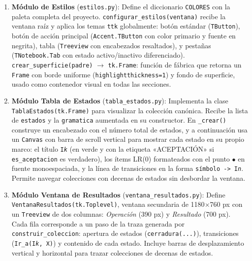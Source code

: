 \begin{enumerate}
  \item \textbf{Módulo de Estilos} (\texttt{estilos.py}):
    Define el diccionario \texttt{COLORES} con la paleta completa del proyecto.
    \texttt{configurar\_estilos(ventana)} recibe la ventana raíz y aplica los temas
    \texttt{ttk} globalmente: botón estándar (\texttt{TButton}), botón de acción
    principal (\texttt{Accent.TButton} con color primario y fuente en negrita),
    tabla (\texttt{Treeview} con encabezados resaltados), y pestañas
    (\texttt{TNotebook.Tab} con estado activo/inactivo diferenciado).
    \texttt{crear\_superficie(padre)} $\to$ \texttt{tk.Frame}: función de fábrica
    que retorna un \texttt{Frame} con borde uniforme (\texttt{highlightthickness=1})
    y fondo de superficie, usado como contenedor visual en todas las secciones.

  \item \textbf{Módulo Tabla de Estados} (\texttt{tabla\_estados.py}):
    Implementa la clase \texttt{TablaEstados(tk.Frame)} para visualizar la colección
    canónica. Recibe la lista de \texttt{estados} y la \texttt{gramatica} aumentada en
    su constructor. En \texttt{\_crear()} construye un encabezado con el número total
    de estados, y a continuación usa un \texttt{Canvas} con barra de scroll vertical
    para mostrar cada estado en su propio marco: el título \texttt{I\textit{k}} (en
    verde y con la etiqueta «ACEPTACIÓN» si \texttt{es\_aceptacion} es verdadero),
    los ítems LR(0) formateados con el punto $\bullet$ en fuente monoespaciada, y la
    línea de transiciones en la forma \texttt{símbolo -> I\textit{n}}. Permite navegar
    colecciones con decenas de estados sin desbordar la ventana.

  \item \textbf{Módulo Ventana de Resultados} (\texttt{ventana\_resultados.py}):
    Define \texttt{VentanaResultados(tk.Toplevel)}, ventana secundaria de 1180$\times$760 px
    con un \texttt{Treeview} de dos columnas: \textit{Operación} (390 px) y
    \textit{Resultado} (700 px). Cada fila corresponde a un paso de la traza generada
    por \texttt{construir\_coleccion}: apertura de estados (\texttt{cerradura(...)}),
    transiciones (\texttt{Ir\_a(I\textit{k}, X)}) y contenido de cada estado.
    Incluye barras de desplazamiento vertical y horizontal para trazar colecciones de
    decenas de estados.


\end{enumerate}

